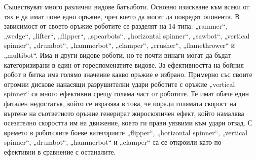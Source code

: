 Съществуват много различни видове батълботи. Основно изискване към всеки от тях е да имат поне едно оръжие, чрез което да могат да повредят опонента. В зависимост от своето оръжие роботите се разделят на 14 типа: „rammer“, „wedge“, „lifter“, „flipper“, „spearbots“, „horizontal spinner“, „sawbot“, „vertical spinner“, „drumbot“, „hammerbot“, „clamper“, „crusher“, „flamethrower“ и „multibot“. Има и други видове роботи, но те почти винаги могат да бъдат категоризирани в един от гореспоменатите видове. За ефективността на бойния робот в битка има голямо значение какво оръжие е избрано. Примерно със своите огромни дискове нанасящи разрушителни удари роботите с оръжие „vertical spinner“ са много ефективни срещу голяма част от роботите. Те имат обаче един фатален недостатък, който се изразява в това, че поради голямата скорост на въртене на съответното оръжие генерират жироскопичен ефект, който намалява осезателно скоростта им на движение, което ги прави уязвими към удари отзад. С времето в роботските боеве категориите „flipper“, „horizontal spinner“, „vertical spinner“, „drumbot“, „hammerbot“ и „clamper“ са се откроили като по-ефективни в сравнение с останалите.
